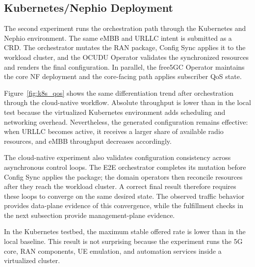 
\subsection{Kubernetes/Nephio Deployment}

The second experiment runs the orchestration path through the Kubernetes and Nephio environment. The same eMBB and URLLC intent is submitted as a CRD. The orchestrator mutates the RAN package, Config Sync applies it to the workload cluster, and the OCUDU Operator validates the synchronized resources and renders the final configuration. In parallel, the free5GC Operator maintains the core NF deployment and the core-facing path applies subscriber QoS state.

Figure~\ref{fig:k8s_qos} shows the same differentiation trend after orchestration through the cloud-native workflow. Absolute throughput is lower than in the local test because the virtualized Kubernetes environment adds scheduling and networking overhead. Nevertheless, the generated configuration remains effective: when URLLC becomes active, it receives a larger share of available radio resources, and eMBB throughput decreases accordingly.

The cloud-native experiment also validates configuration consistency across asynchronous control loops. The E2E orchestrator completes its mutation before Config Sync applies the package; the domain operators then reconcile resources after they reach the workload cluster. A correct final result therefore requires these loops to converge on the same desired state. The observed traffic behavior provides data-plane evidence of this convergence, while the fulfillment checks in the next subsection provide management-plane evidence.

In the Kubernetes testbed, the maximum stable offered rate is lower than in the local baseline. This result is not surprising because the experiment runs the 5G core, RAN components, UE emulation, and automation services inside a virtualized cluster.

